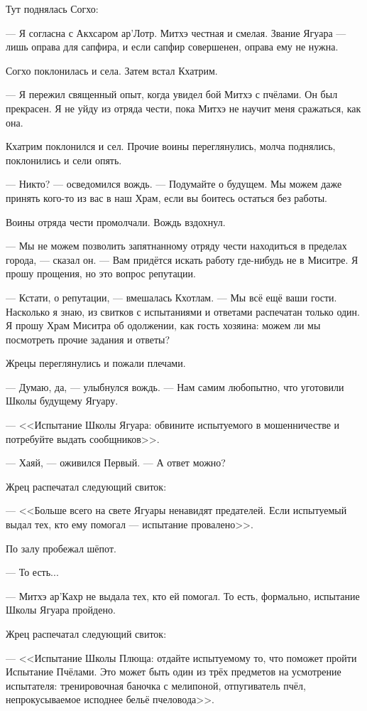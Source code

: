 Тут поднялась Согхо:

--- Я согласна с Акхсаром ар'Лотр.
Митхэ честная и смелая.
Звание Ягуара --- лишь оправа для сапфира, и если сапфир совершенен, оправа ему не нужна.

Согхо поклонилась и села.
Затем встал Кхатрим.

--- Я пережил священный опыт, когда увидел бой Митхэ с пчёлами.
Он был прекрасен.
Я не уйду из отряда чести, пока Митхэ не научит меня сражаться, как она.

Кхатрим поклонился и сел.
Прочие воины переглянулись, молча поднялись, поклонились и сели опять.

--- Никто? --- осведомился вождь.
--- Подумайте о будущем.
Мы можем даже принять кого-то из вас в наш Храм, если вы боитесь остаться без работы.

Воины отряда чести промолчали.
Вождь вздохнул.

--- Мы не можем позволить запятнанному отряду чести находиться в пределах города, --- сказал он.
--- Вам придётся искать работу где-нибудь не в Миситре.
Я прошу прощения, но это вопрос репутации.

--- Кстати, о репутации, --- вмешалась Кхотлам.
--- Мы всё ещё ваши гости.
Насколько я знаю, из свитков с испытаниями и ответами распечатан только один.
Я прошу Храм Миситра об одолжении, как гость хозяина: можем ли мы посмотреть прочие задания и ответы?

Жрецы переглянулись и пожали плечами.

--- Думаю, да, --- улыбнулся вождь.
--- Нам самим любопытно, что уготовили Школы будущему Ягуару.

\textspace

--- <<Испытание Школы Ягуара: обвините испытуемого в мошенничестве и потребуйте выдать сообщников>>.

--- Хаяй, --- оживился Первый.
--- А ответ можно?

Жрец распечатал следующий свиток:

--- <<Больше всего на свете Ягуары ненавидят предателей.
Если испытуемый выдал тех, кто ему помогал --- испытание провалено>>.

По залу пробежал шёпот.

--- То есть...

--- Митхэ ар'Кахр не выдала тех, кто ей помогал.
То есть, формально, испытание Школы Ягуара пройдено.

Жрец распечатал следующий свиток:

--- <<Испытание Школы Плюща: отдайте испытуемому то, что поможет пройти Испытание Пчёлами.
Это может быть один из трёх предметов на усмотрение испытателя: тренировочная баночка с мелипоной, отпугиватель пчёл, непрокусываемое исподнее бельё пчеловода>>.

